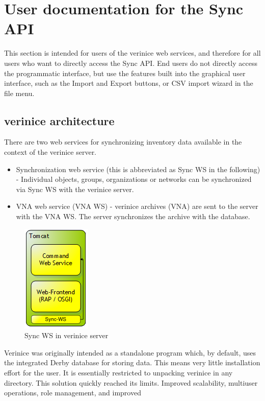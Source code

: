\documentclass[a4paper,10pt]{book}
\begin{document}
\section{User documentation for the Sync API}
This section is intended for users of the verinice web services, and therefore for all users who want to
directly access the Sync API.
\newline
End users do not directly access the programmatic interface, but use the features built into the graphical
user interface, such as the Import and Export buttons, or CSV import wizard in the file menu.

\subsection{verinice architecture}
There are two web services for synchronizing inventory data available in the context of the verinice server.
\begin{itemize}
 \item Synchronization web service (this is abbreviated as Sync WS in the following) - Individual objects, groups, organizations or networks can be synchronized via Sync WS with the verinice server.
 \item VNA web service (VNA WS) - verinice archives (VNA) are sent to the server with the VNA WS. The server synchronizes the archive with the database.
\end{itemize}
\begin{figure}[htb!]
  \centering
  \includegraphics[scale=.7]{Screenshot/Verinice_server_plus_ws-en.png}
  \caption{\label{Sync-WS im verinice-Server} Sync WS in verinice server}
\end{figure}
\vspace{1cm}
Verinice was originally intended as a standalone program which, by default, uses the integrated Derby
database for storing data. This means very little installation effort for the user. It is essentially
restricted to unpacking verinice in any directory. This solution quickly reached its limits. Improved scalability, multiuser operations, role management, and improved
\end{document}
